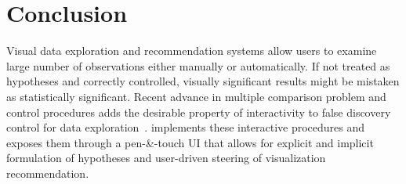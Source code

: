 \section{Conclusion}
\label{sec:conclusion}
Visual data exploration and recommendation systems allow users to examine large number of observations either manually or automatically. 
If not treated as hypotheses and correctly controlled, visually significant results might be mistaken as statistically significant. 
Recent advance in multiple comparison problem and control procedures adds the desirable property of interactivity to false discovery control for data exploration~\cite{zhao2016controlling}.  
\system{} implements these interactive procedures and exposes them through a pen-\&-touch UI that allows for explicit and implicit formulation of hypotheses and user-driven steering of visualization recommendation.